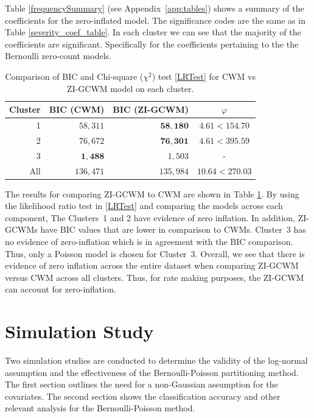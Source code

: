 \documentclass[12pt,letterpaper]{article}
\numberwithin{equation}{section}
\numberwithin{equation}{section}
\numberwithin{equation}{section}
\begin{document}
Table \ref{frequencySummary} (see Appendix~\ref{app:tables}) shows a summary of the coefficients for the zero-inflated model. The
significance codes are the same as in Table \ref{severity_coef_table}. In each cluster we can see that the majority of the coefficients are significant. Specifically for the coefficients pertaining to the the Bernoulli zero-count models. 

\begin{table}[!htb]
 \begin{center}
\caption{Comparison of BIC and Chi-square ($\chi^2$) test \eqref{LRTest} for CWM vs ZI-GCWM model on each cluster. }
\label{compareResults_models}
\begin{tabular}{r|rrc}
\hline
Cluster & BIC (CWM)  & BIC (ZI-GCWM) &  $\varphi $\\
\hline
 1 & $58,311$ & $\bm{58,180}$ & $ 4.61 < 154.70$ \\
 2 & $76,672$ & $\bm{76,301}$ & $ 4.61 < 395.59 $\\
 3 & $\bm{1,488}$  & $1,503$ &  -  \\ 
\hline 
All & $136,471$ & $135,984$ &  $10.64 < 270.03$
  \\
\hline
\end{tabular}
\end{center}
\end{table}
The results for comparing ZI-GCWM to CWM are shown in Table \ref{compareResults_models}. By using the likelihood ratio test in \eqref{LRTest} and comparing the models across each component, The Clusters~1 and 2 have evidence of zero inflation. In addition, ZI-GCWMs have BIC values that are lower in comparison to CWMs.  Cluster~3 has no evidence of zero-inflation which is in agreement with the BIC comparison. Thus, only a Poisson model is chosen for Cluster~3.  Overall, we see that there is evidence of zero inflation across the entire dataset when comparing ZI-GCWM versus CWM across all clusters. Thus, for rate making purposes, the ZI-GCWM can account for zero-inflation.


\section{Simulation Study}\label{sec:sim}

Two simulation studies are conducted to determine the validity of the log-normal assumption and the effectiveness of the Bernoulli-Poisson partitioning method. The first section outlines the need for a non-Gaussian assumption for the covariates. The second section shows the classification accuracy and other relevant analysis for the Bernoulli-Poisson method.
\end{document}
